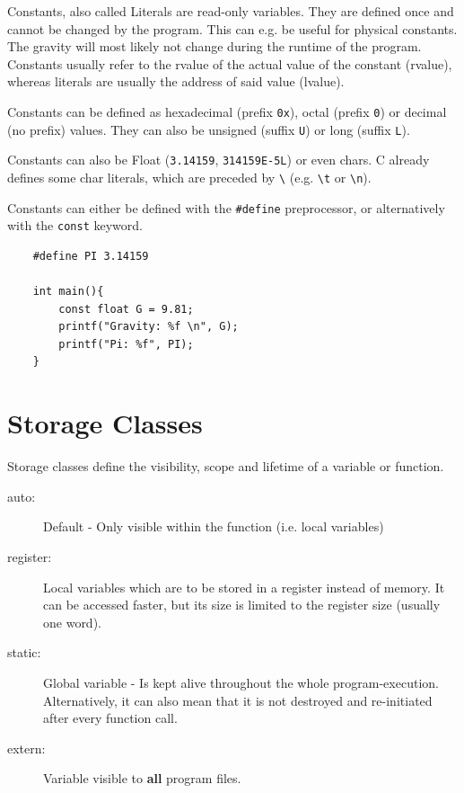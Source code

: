 \documentclass[a4paper, 11pt]{article}
\newcommand{\code}[1]{\texttt{#1}}
\begin{document}
Constants, also called Literals are read-only variables. They are defined once and cannot be changed by the program. This can e.g. be useful for physical constants. The gravity will most likely not change during the runtime of the program. Constants usually refer to the rvalue of the actual value of the constant (rvalue), whereas literals are usually the address of said value (lvalue).

Constants can be defined as hexadecimal (prefix \code{0x}), octal (prefix \code{0}) or decimal (no prefix) values. They can also be unsigned (suffix \code{U}) or long (suffix \code{L}). 




\vspace{10px}
\begin{minipage}{0.45\textwidth}
    Constants can also be Float (\code{3.14159}, \code{314159E-5L}) or even chars. C already defines some char literals, which are preceded by \code{\textbackslash} (e.g. \code{\textbackslash t} or \code{\textbackslash n}).

    Constants can either be defined with the \code{\#define} preprocessor, or alternatively with the \code{const} keyword. 
\end{minipage}\hfill
\begin{minipage}{0.45\textwidth}
    \begin{verbatim}
    #define PI 3.14159

    int main(){
        const float G = 9.81;
        printf("Gravity: %f \n", G);
        printf("Pi: %f", PI);
    }
    \end{verbatim}
\end{minipage}

\section{Storage Classes}

Storage classes define the visibility, scope and lifetime of a variable or function.

\begin{description}
    \item[auto: ] Default - Only visible within the function (i.e. local variables)
    \item[register: ] Local variables which are to be stored in a register instead of memory. It can be accessed faster, but its size is limited to the register size (usually one word).
    \item[static: ] Global variable - Is kept alive throughout the whole program-execution. Alternatively, it can also mean that it is not destroyed and re-initiated after every function call.
    \item[extern: ] Variable visible to \textbf{all} program files.
\end{description}
\end{document}
